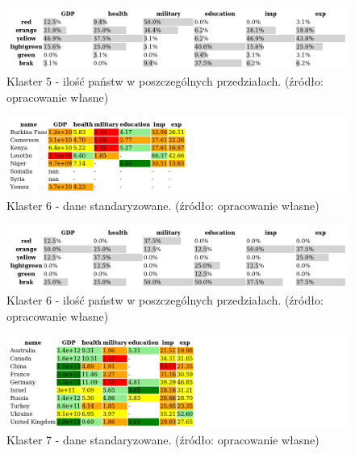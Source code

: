 \documentclass[11pt]{report}
\begin{document}
    \begin{figure}[ht!]
        \centering
        \includegraphics[width=1 \textwidth]{tables/CLUST/cluster5stdkmeanscount.png}
        \caption{Klaster 5 - ilość państw w poszczególnych przedziałach. (źródło: opracowanie własne)}
        \label{tab:cl5stdcount}
    \end{figure}

    

    \begin{figure}[ht!]
        \centering
        \includegraphics[width=1 \textwidth]{tables/CLUST/cluster6stdkmeans.png}
        \caption{Klaster 6 - dane standaryzowane. (źródło: opracowanie własne)}
        \label{tab:cl6std}
    \end{figure}

    \begin{figure}[ht!]
        \centering
        \includegraphics[width=1 \textwidth]{tables/CLUST/cluster6stdkmeanscount.png}
        \caption{Klaster 6 - ilość państw w poszczególnych przedziałach. (źródło: opracowanie własne)}
        \label{tab:cl6stdcount}
    \end{figure}

    

    \begin{figure}[ht!]
        \centering
        \includegraphics[width=1 \textwidth]{tables/CLUST/cluster7stdkmeans.png}
        \caption{Klaster 7 - dane standaryzowane. (źródło: opracowanie własne)}
        \label{tab:cl7std}
    \end{figure}
\end{document}
